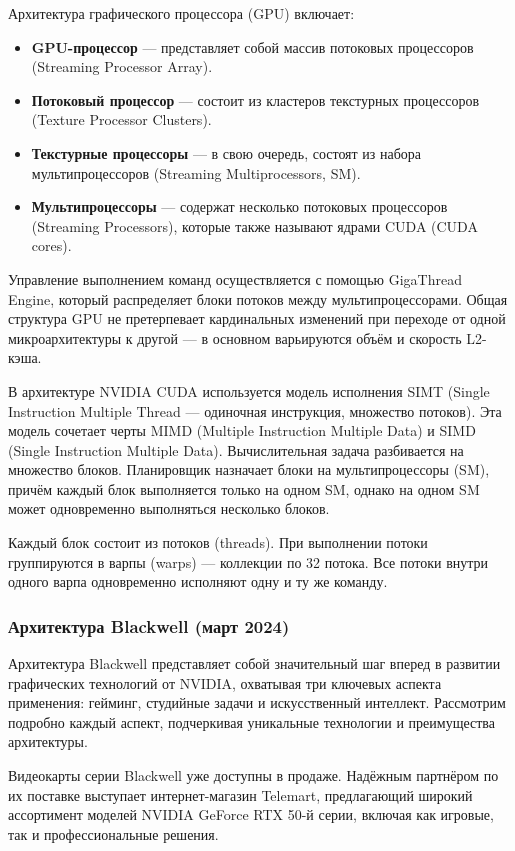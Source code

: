 \documentclass{article}[14pt]
\begin{document}
Архитектура графического процессора (GPU) включает:

\begin{itemize}
\item \textbf{GPU-процессор} — представляет собой массив потоковых процессоров (Streaming Processor Array).
\item \textbf{Потоковый процессор} — состоит из кластеров текстурных процессоров (Texture Processor Clusters).
\item \textbf{Текстурные процессоры} — в свою очередь, состоят из набора мультипроцессоров (Streaming Multiprocessors, SM).
\item \textbf{Мультипроцессоры} — содержат несколько потоковых процессоров (Streaming Processors), которые также называют ядрами CUDA (CUDA cores).
\end{itemize}

Управление выполнением команд осуществляется с помощью GigaThread Engine, который распределяет блоки потоков между мультипроцессорами. 
Общая структура GPU не претерпевает кардинальных изменений при переходе от одной микроархитектуры к другой — в основном варьируются объём 
и скорость L2-кэша.

В архитектуре NVIDIA CUDA используется модель исполнения SIMT (Single Instruction Multiple Thread — одиночная инструкция, множество потоков). 
Эта модель сочетает черты MIMD (Multiple Instruction Multiple Data) и SIMD (Single Instruction Multiple Data). Вычислительная задача 
разбивается на множество блоков. Планировщик назначает блоки на мультипроцессоры (SM), причём каждый блок выполняется только на одном SM, 
однако на одном SM может одновременно выполняться несколько блоков.

Каждый блок состоит из потоков (threads). При выполнении потоки группируются в варпы (warps) — коллекции по 32 потока. Все потоки внутри 
одного варпа одновременно исполняют одну и ту же команду.

\subsubsection{Архитектура Blackwell (март 2024)}

Архитектура Blackwell представляет собой значительный шаг вперед в развитии графических технологий от NVIDIA, охватывая три ключевых аспекта 
применения: гейминг, студийные задачи и искусственный интеллект. Рассмотрим подробно каждый аспект, подчеркивая уникальные технологии и 
преимущества архитектуры. 

Видеокарты серии Blackwell уже доступны в продаже. Надёжным партнёром по их поставке выступает интернет-магазин Telemart, предлагающий широкий 
ассортимент моделей NVIDIA GeForce RTX 50-й серии, включая как игровые, так и профессиональные решения.
\end{document}
